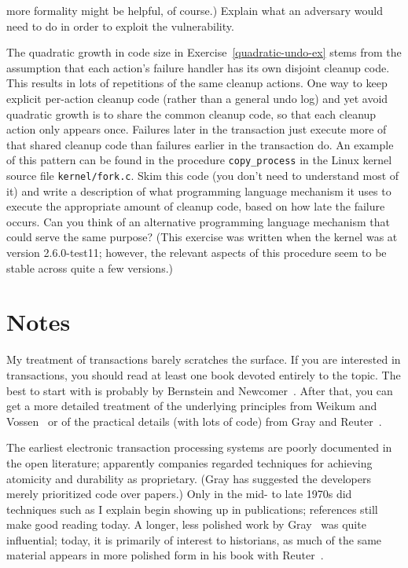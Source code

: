 \begin{chapterEnumerate}
more formality might be helpful, of course.)  Explain what an
adversary would need to do in order to exploit the vulnerability.
\item
\label{kernel-failure-atomicity-exercise}
The quadratic growth in code size in Exercise~\ref{quadratic-undo-ex} stems
from the assumption that each action's failure handler has its own disjoint
cleanup code.  This results in lots of repetitions of the same cleanup
actions.  One way to keep explicit per-action cleanup code (rather than a
general undo log) and yet avoid quadratic growth is to share the common
cleanup code, so that each cleanup action only appears once.  Failures later
in the transaction just execute more of that shared cleanup code than
failures earlier in the transaction do. An example of this pattern can
be found in the procedure \verb|copy_process| in the Linux kernel
source file \verb|kernel/fork.c|.  Skim this code (you don't need to
understand most of it) and write a description of what
programming language mechanism it uses to execute the appropriate
amount of cleanup code, based on how late the failure occurs.  Can you
think of an alternative programming language mechanism that could
serve the same purpose?  (This exercise was written when the kernel
was at version 2.6.0-test11; however, the relevant aspects of this
procedure seem to be stable across quite a few versions.)
\end{chapterEnumerate}

\section*{Notes}

My treatment of transactions barely scratches the surface.
If you are interested in transactions, you should read at
least one book devoted entirely to the topic.  The best to start with
is probably by Bernstein and
Newcomer~\cite{max1054}.  After that, you can
get a more detailed treatment of the underlying principles from
Weikum and Vossen~\cite{max1085}
or of the practical details (with lots of code) from 
Gray and Reuter~\cite{max1009}.

The earliest electronic transaction processing systems are poorly
documented in the open literature; apparently companies regarded
techniques for achieving atomicity and durability as proprietary.
(Gray has suggested the developers merely prioritized code over
papers.)  Only in the mid- to late 1970s did techniques such as I
explain begin showing up in publications;
references \cite{max1005,max1007,max1050,max1004} still make good reading today.  A
longer, less polished work by Gray~\cite{max1056} was quite
influential; today, it is primarily of interest to historians, as much
of the same material appears in more polished form in his book with Reuter~\cite{max1009}.

